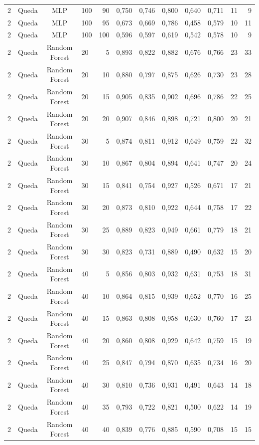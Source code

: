 \begin{longtable}{ccclrrrrrrrr}
2 & Queda & MLP & 100 & 90 & 0,750 & 0,746 & 0,800 & 0,640 & 0,711 & 11 & 9 \\
2 & Queda & MLP & 100 & 95 & 0,673 & 0,669 & 0,786 & 0,458 & 0,579 & 10 & 11 \\
2 & Queda & MLP & 100 & 100 & 0,596 & 0,597 & 0,619 & 0,542 & 0,578 & 10 & 9 \\
2 & Queda & Random Forest & 20 & 5 & 0,893 & 0,822 & 0,882 & 0,676 & 0,766 & 23 & 33 \\
2 & Queda & Random Forest & 20 & 10 & 0,880 & 0,797 & 0,875 & 0,626 & 0,730 & 23 & 28 \\
2 & Queda & Random Forest & 20 & 15 & 0,905 & 0,835 & 0,902 & 0,696 & 0,786 & 22 & 25 \\
2 & Queda & Random Forest & 20 & 20 & 0,907 & 0,846 & 0,898 & 0,721 & 0,800 & 20 & 21 \\
2 & Queda & Random Forest & 30 & 5 & 0,874 & 0,811 & 0,912 & 0,649 & 0,759 & 22 & 32 \\
2 & Queda & Random Forest & 30 & 10 & 0,867 & 0,804 & 0,894 & 0,641 & 0,747 & 20 & 24 \\
2 & Queda & Random Forest & 30 & 15 & 0,841 & 0,754 & 0,927 & 0,526 & 0,671 & 17 & 21 \\
2 & Queda & Random Forest & 30 & 20 & 0,873 & 0,810 & 0,922 & 0,644 & 0,758 & 17 & 22 \\
2 & Queda & Random Forest & 30 & 25 & 0,889 & 0,823 & 0,949 & 0,661 & 0,779 & 18 & 21 \\
2 & Queda & Random Forest & 30 & 30 & 0,823 & 0,731 & 0,889 & 0,490 & 0,632 & 15 & 20 \\
2 & Queda & Random Forest & 40 & 5 & 0,856 & 0,803 & 0,932 & 0,631 & 0,753 & 18 & 31 \\
2 & Queda & Random Forest & 40 & 10 & 0,864 & 0,815 & 0,939 & 0,652 & 0,770 & 16 & 25 \\
2 & Queda & Random Forest & 40 & 15 & 0,863 & 0,808 & 0,958 & 0,630 & 0,760 & 17 & 23 \\
2 & Queda & Random Forest & 40 & 20 & 0,860 & 0,808 & 0,929 & 0,642 & 0,759 & 15 & 19 \\
2 & Queda & Random Forest & 40 & 25 & 0,847 & 0,794 & 0,870 & 0,635 & 0,734 & 16 & 20 \\
2 & Queda & Random Forest & 40 & 30 & 0,810 & 0,736 & 0,931 & 0,491 & 0,643 & 14 & 18 \\
2 & Queda & Random Forest & 40 & 35 & 0,793 & 0,722 & 0,821 & 0,500 & 0,622 & 14 & 19 \\
2 & Queda & Random Forest & 40 & 40 & 0,839 & 0,776 & 0,885 & 0,590 & 0,708 & 15 & 15 \\

\end{longtable}
